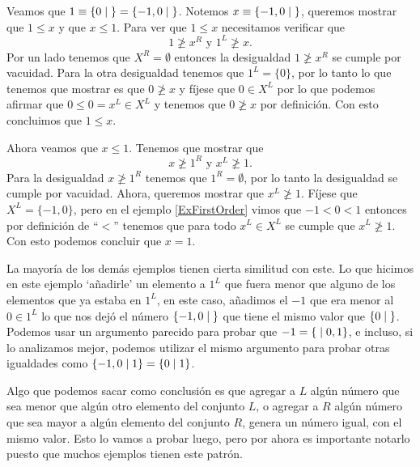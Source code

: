     \begin{example} \label{ExErasePar}
        Veamos que $1\equiv \left\{0\;\middle|\; \right\} = \left\{-1, 0\;\middle|\; \right\}$. Notemos $x\equiv \left\{-1, 0\;\middle|\; \right\}$, queremos mostrar que $1 \le x$ y que $x \le 1$. Para ver que $1\le x$ necesitamos verificar que
        \[
            1 \not\ge x^R \text{ y } 1^L \not\ge x.
        \]
        Por un lado tenemos que $X^R = \emptyset$ entonces la desigualdad $1 \not\ge x^R$ se cumple por vacuidad. Para la otra desigualdad tenemos que $1^L=\{0\}$, por lo tanto lo que tenemos que mostrar es que $0 \not\ge x$ y f\'ijese que $0\in X^L$ por lo que podemos afirmar que $0\le 0 = x^L\in X^L$ y tenemos que $0 \not\ge x$ por definici\'on. Con esto concluimos que $1\le x$.

        Ahora veamos que $x\le 1$. Tenemos que mostrar que
        \[
            x \not\ge 1^R \text{ y } x^L \not\ge 1.
        \]
        Para la desigualdad $x \not\ge 1^R$ tenemos que $1^R = \emptyset$, por lo tanto la desigualdad se cumple por vacuidad. Ahora, queremos mostrar que $x^L \not\ge 1$. F\'ijese que $X^L = \{-1, 0\}$, pero en el ejemplo \ref{ExFirstOrder} vimos que $-1 < 0 < 1$ entonces por definici\'on de ``$<$'' tenemos que para todo $x^L\in X^L$ se cumple que $x^L \not\ge 1$. Con esto podemos concluir que $x = 1$.
        
        La mayor\'ia de los dem\'as ejemplos tienen cierta similitud con este. Lo que hicimos en este ejemplo `añadirle' un elemento a $1^L$ que fuera menor que alguno de los elementos que ya estaba en $1^L$, en este caso, añadimos el $-1$ que era menor al $0\in 1^L$ lo que nos dej\'o el n\'umero $\left\{-1,0\;\middle|\; \right\}$ que tiene el mismo valor que $\left\{0\;\middle|\; \right\}$. Podemos usar un argumento parecido para probar que $-1 = \left\{\;\middle|\; 0,1\right\}$, e incluso, si lo analizamos mejor, podemos utilizar el mismo argumento para probar otras igualdades como $\left\{-1,0\;\middle|\; 1\right\} = \left\{0\;\middle|\; 1\right\}$.

        Algo que podemos sacar como conclusi\'on es que agregar a $L$ alg\'un n\'umero que sea menor que alg\'un otro elemento del conjunto $L$, o agregar a $R$ alg\'un n\'umero que sea mayor a alg\'un elemento del conjunto $R$, genera un n\'umero igual, con el mismo valor. Esto lo vamos a probar luego, pero por ahora es importante notarlo puesto que muchos ejemplos tienen este patr\'on.
    \end{example}

